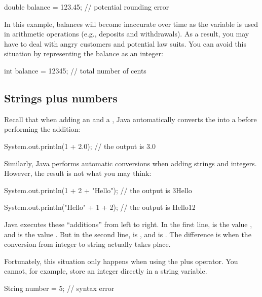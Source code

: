 \begin{code}
    double balance = 123.45;  // potential rounding error
\end{code}

In this example, balances will become inaccurate over time as the variable is used in arithmetic operations (e.g., deposits and withdrawals).
As a result, you may have to deal with angry customers and potential law suits.
You can avoid this situation by representing the balance as an integer:

\begin{code}
    int balance = 12345;      // total number of cents
\end{code}

\subsection{Strings plus numbers}

Recall that when adding an  and a , Java automatically converts the  into a  before performing the addition:

\begin{code}
    System.out.println(1 + 2.0);
    // the output is 3.0
\end{code}

Similarly, Java performs automatic conversions when adding strings and integers.
However, the result is not what you may think:

\begin{code}
    System.out.println(1 + 2 + "Hello");
    // the output is 3Hello
    
    System.out.println("Hello" + 1 + 2);
    // the output is Hello12
\end{code}

Java executes these ``additions'' from left to right.
In the first line,  is the value , and  is the value .
But in the second line,  is , and  is .
The difference is when the conversion from integer to string actually takes place.

Fortunately, this situation only happens when using the plus operator.
You cannot, for example, store an integer directly in a string variable.

\begin{code}
     String number = 5;  // syntax error
\end{code}

